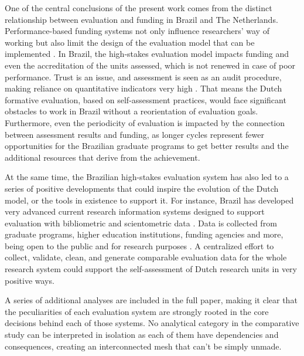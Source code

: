 One of the central conclusions of the present work comes from the distinct relationship between evaluation and funding in Brazil and The Netherlands. Performance-based funding systems not only influence researchers’ way of working but also limit the design of the evaluation model that can be implemented \autocite{Hicks.2012}. In Brazil, the high-stakes evaluation model impacts funding and even the accreditation of the units assessed, which is not renewed in case of poor performance. Trust is an issue, and assessment is seen as an audit procedure, making reliance on quantitative indicators very high \autocite{Rafols.2016}. That means the Dutch formative evaluation, based on self-assessment practices, would face significant obstacles to work in Brazil without a reorientation of evaluation goals. Furthermore, even the periodicity of evaluation is impacted by the connection between assessment results and funding, as longer cycles represent fewer opportunities for the Brazilian graduate programs to get better results and the additional resources that derive from the achievement.

At the same time, the Brazilian high-stakes evaluation system has also led to a series of positive developments that could inspire the evolution of the Dutch model, or the tools in existence to support it. For instance, Brazil has developed very advanced current research information systems designed to support evaluation with bibliometric and scientometric data \autocite{Siqueira.2019}. Data is collected from graduate programs, higher education institutions, funding agencies and more, being open to the public and for research purposes \autocite{CAPES.2021d}. A centralized effort to collect, validate, clean, and generate comparable evaluation data for the whole research system could support the self-assessment of Dutch research units in very positive ways.

A series of additional analyses are included in the full paper, making it clear that the peculiarities of each evaluation system are strongly rooted in the core decisions behind each of those systems. No analytical category in the comparative study can be interpreted in isolation as each of them have dependencies and consequences, creating an interconnected mesh that can’t be simply unmade.
